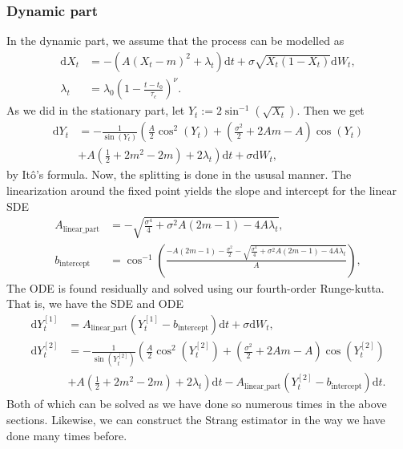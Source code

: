 \subsubsection{Dynamic part}
In the dynamic part, we assume that the process can be modelled as
\begin{align}
    \mathrm{d}X_t &= -\left(A(X_t - m)^2 + \lambda_t\right)\mathrm{d}t + \sigma \sqrt{X_t\left(1 - X_t\right)}\mathrm{d}W_t,\\
    \lambda_t &= \lambda_0 \left(1 - \frac{t - t_0}{\tau_c}\right)^\nu.
\end{align}
As we did in the stationary part, let $Y_t := 2 \sin^{-1}\left(\sqrt{X_t}\right)$. Then we get 
\begin{align}
    \mathrm{d}Y_t &= - \frac{1}{\sin(Y_t)}\left(\frac{A}{2}\cos^2(Y_t) + \left(\frac{\sigma^2}{2} + 2 Am - A\right)\cos(Y_t) \right. \nonumber \\
    &+ \left. A \left(\frac{1}{2} + 2m^2 - 2m\right) + 2\lambda_t\right)\mathrm{d}t + \sigma \mathrm{d}W_t, \label{eq:JacobiLampertiDynamicSDE}
\end{align}
by Itô's formula. Now, the splitting is done in the ususal manner. The linearization around the fixed point yields the slope and intercept for the linear SDE
\begin{align}
    A_{\mathrm{linear\_part}} &= -\sqrt{\frac{\sigma^4}{4} + \sigma^2A\left(2m - 1\right) - 4A\lambda_t},\\
    b_{\mathrm{intercept}} &= \cos^{-1}\left(\frac{-A\left(2m - 1\right) - \frac{\sigma^2}{2} - \sqrt{\frac{\sigma^4}{4} + \sigma^2A\left(2m - 1\right) - 4A\lambda_t}}{A}\right),
\end{align}
The ODE is found residually and solved using our fourth-order Runge-kutta. That is, we have the SDE and ODE
\begin{align}
    \mathrm{d}Y_t^{[1]} &= A_{\mathrm{linear\_part}}\left(Y_t^{[1]} -  b_{\mathrm{intercept}}\right)\mathrm{d}t + \sigma \mathrm{d}W_t,\\
    \mathrm{d}Y_t^{[2]} &=- \frac{1}{\sin(Y_t^{[2]})}\left(\frac{A}{2}\cos^2(Y_t^{[2]}) + \left(\frac{\sigma^2}{2} + 2 Am - A\right)\cos(Y_t^{[2]}) \right. \nonumber \\
    &+ \left. A \left(\frac{1}{2} + 2m^2 - 2m\right) + 2\lambda_t\right) \mathrm{d}t - A_{\mathrm{linear\_part}}\left(Y_t^{[2]} -  b_{\mathrm{intercept}}\right)\mathrm{d}t  \label{eq:dynamicjacobiODE}.
\end{align}
Both of which can be solved as we have done so numerous times in the above sections. Likewise, we can construct the Strang estimator in the way we have done many times before.
\newpage
